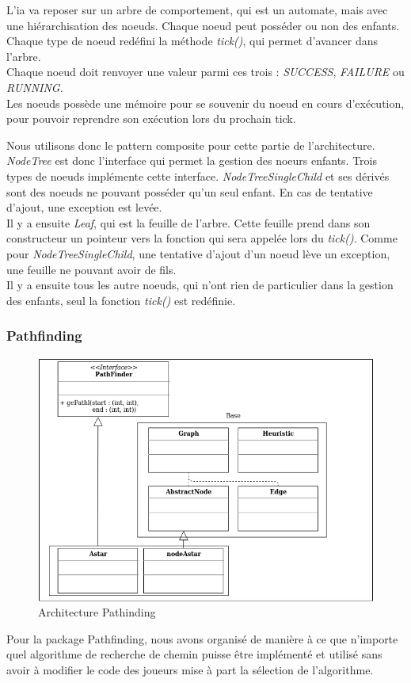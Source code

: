 L'ia va reposer sur un arbre de comportement, qui est un automate, mais avec une hiérarchisation des noeuds. Chaque noeud peut posséder ou non des enfants. Chaque type de noeud redéfini la méthode \textit{tick()}, qui permet d'avancer dans l'arbre.\\
Chaque noeud doit renvoyer une valeur parmi ces trois : \textit{SUCCESS}, \textit{FAILURE} ou \textit{RUNNING}.\\
Les noeuds possède une mémoire pour se souvenir du noeud en cours d'exécution, pour pouvoir reprendre son exécution lors du prochain tick.

Nous utilisons donc le pattern composite pour cette partie de l'architecture. \textit{NodeTree} est donc l'interface qui permet la gestion des noeurs enfants. Trois types de noeuds implémente cette interface. \textit{NodeTreeSingleChild} et ses dérivés sont des noeuds ne pouvant posséder qu'un seul enfant. En cas de tentative d'ajout, une exception est levée.\\
Il y a ensuite \textit{Leaf}, qui est la feuille de l'arbre. Cette feuille prend dans son constructeur un pointeur vers la fonction qui sera appelée lors du \textit{tick()}. Comme pour \textit{NodeTreeSingleChild}, une tentative d'ajout d'un noeud lève un exception, une feuille ne pouvant avoir de fils.\\
Il y a ensuite tous les autre noeuds, qui n'ont rien de particulier dans la gestion des enfants, seul la fonction \textit{tick()} est redéfinie.

\subsubsection{Pathfinding}

\begin{figure}[H]
    \centering
    \includegraphics[scale=0.7]{data/pathfindingArchi.png}
    \caption{Architecture Pathinding}
    \label{}
\end{figure}
Pour la package Pathfinding, nous avons organisé de manière à ce que n'importe quel algorithme de recherche de chemin puisse être implémenté et utilisé sans avoir à modifier le code des joueurs mise à part la sélection de l'algorithme.

